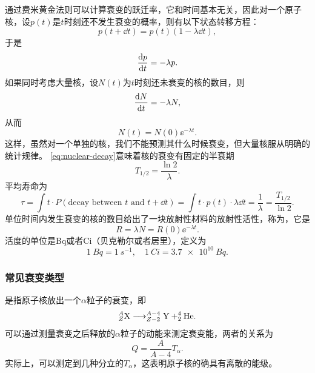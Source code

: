 通过费米黄金法则可以计算衰变的跃迁率，它和时间基本无关，因此对一个原子核，设$p(t)$是$t$时刻还不发生衰变的概率，则有以下状态转移方程：
\[
    p(t+\dd{t}) = p(t) (1 - \lambda \dd{t}),
\]
于是
\[
    \dv{p}{t} = - \lambda p.
\]
如果同时考虑大量核，设$N(t)$为$t$时刻还未衰变的核的数目，则
\[
    \dv{N}{t} = - \lambda N,
\]
从而
\begin{equation}
    N(t) = N(0) \ee^{- \lambda t}.
    \label{eq:nuclear-decay}
\end{equation}
这样，虽然对一个单独的核，我们不能预测其什么时候衰变，但大量核服从明确的统计规律。
\eqref{eq:nuclear-decay}意味着核的衰变有固定的半衰期
\begin{equation}
    T_{1/2} = \frac{\ln 2}{\lambda}.    
\end{equation}
平均寿命为
\begin{equation}
    \tau = \int t \cdot P(\text{decay between $t$ and $t+\dd{t}$}) = \int t \cdot p(t) \cdot \lambda \dd{t} = \frac{1}{\lambda} = \frac{T_{1/2}}{\ln 2}.
\end{equation}
单位时间内发生衰变的核的数目给出了一块放射性材料的放射性活性，称为，它是
\begin{equation}
    R = \lambda N = R(0) \ee^{-\lambda t}.
\end{equation}
活度的单位是\si{Bq}或者\si{Ci}（贝克勒尔或者居里），定义为
\[
    \SI{1}{Bq} = \SI{1}{s^{-1}}, \quad \SI{1}{Ci} = \SI{3.7e10}{Bq}.
\]

\subsubsection{常见衰变类型}

是指原子核放出一个$\alpha$粒子的衰变，即
\[
    \nuclear{X}{A}{Z} \longrightarrow \nuclear{Y}{A-4}{Z-2} + \nuclear{He}{4}{2}.
\]
可以通过测量衰变之后释放的$\alpha$粒子的动能来测定衰变能，两者的关系为
\begin{equation}
    Q = \frac{A}{A-4} T_\alpha.
\end{equation}
实际上，可以测定到几种分立的$T_\alpha$，这表明原子核的确具有离散的能级。

